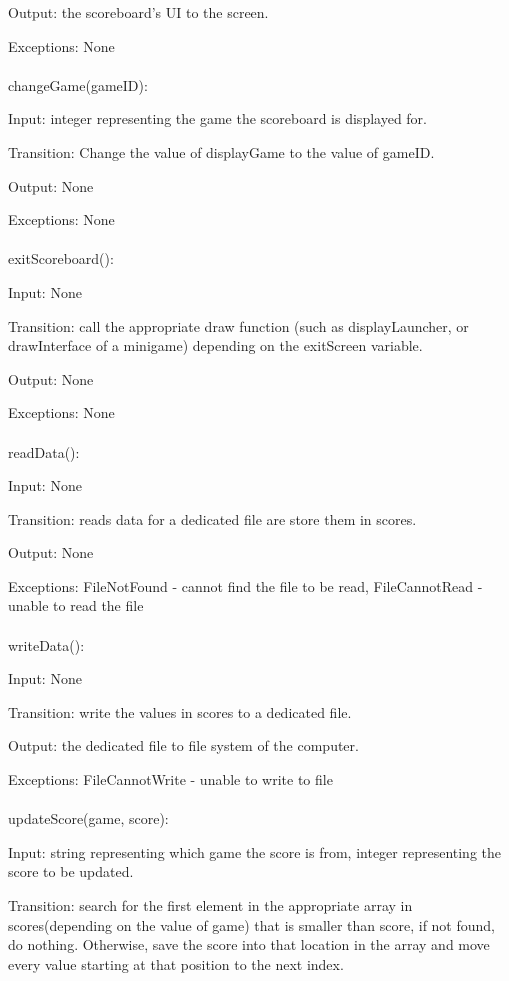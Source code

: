 \documentclass[12pt, titlepage]{article}
\begin{document}
		Output: the scoreboard's UI to the screen.
		
		Exceptions: None\\
		\\
		changeGame(gameID):
		
		Input: integer representing the game the scoreboard is displayed for.
		
		Transition: Change the value of displayGame to the value of gameID.
		
		Output: None
		
		Exceptions: None\\
		\\
		exitScoreboard():
		
		Input: None
		
		Transition: call the appropriate draw function (such as displayLauncher, or drawInterface of a minigame) depending on the exitScreen variable.
		
		Output: None
		
		Exceptions: None\\
		\\
		readData():
		
		Input: None
		
		Transition: reads data for a dedicated file are store them in scores.
		
		Output: None
		
		Exceptions: FileNotFound - cannot find the file to be read, FileCannotRead - unable to read the file\\
		\\
		writeData():
		
		Input: None
		
		Transition: write the values in scores to a dedicated file.
		
		Output: the dedicated file to file system of the computer.
		
		Exceptions: FileCannotWrite - unable to write to file\\
		\\
		updateScore(game, score):
		
		Input: string representing which game the score is from,  integer representing the score to be updated.
		
		Transition: search for the first element in the appropriate array in scores(depending on the value of game) that is smaller than score, if not found, do nothing. Otherwise, save the score into that location in the array and move every value starting at that position to the next index.
		
\end{document}
